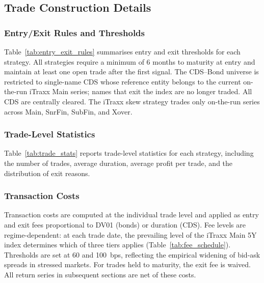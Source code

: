 \subsection{Trade Construction Details}
\label{app:trade_details}

\subsubsection{Entry/Exit Rules and Thresholds}
\label{app:entry_exit}
Table~\ref{tab:entry_exit_rules} summarises entry and exit thresholds
for each strategy. All strategies require a minimum of 6 months to
maturity at entry and maintain at least one open trade after the first
signal. The CDS--Bond universe is restricted to single-name CDS whose
reference entity belongs to the current on-the-run iTraxx Main series;
names that exit the index are no longer traded. All CDS are centrally
cleared. The iTraxx skew strategy trades only on-the-run series across
Main, SnrFin, SubFin, and Xover.



\subsubsection{Trade-Level Statistics}
\label{app:trade_stats}

Table~\ref{tab:trade_stats} reports trade-level statistics for each
strategy, including the number of trades, average duration, average
profit per trade, and the distribution of exit reasons.



\subsubsection{Transaction Costs}
\label{app:fees}
Transaction costs are computed at the individual trade level and applied
as entry and exit fees proportional to DV01 (bonds) or duration (CDS).
Fee levels are regime-dependent: at each trade date, the prevailing level
of the iTraxx Main 5Y index determines which of three tiers applies
(Table~\ref{tab:fee_schedule}). Thresholds are set at 60 and 100~bps,
reflecting the empirical widening of bid-ask spreads in stressed markets.
For trades held to maturity, the exit fee is waived. All return series in subsequent sections are net of these costs.



